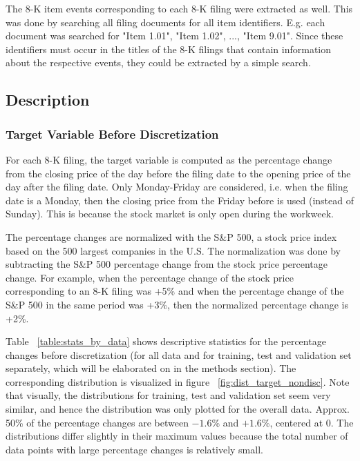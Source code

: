 \documentclass{article}
\begin{document}
	The 8-K item events corresponding to each 8-K filing were extracted as well. This was done by searching all filing documents for all item identifiers. E.g. each document was searched for "Item 1.01", "Item 1.02", ..., "Item 9.01". Since these identifiers must occur in the titles of the 8-K filings that contain information about the respective events, they could be extracted by a simple search. 
	
	\subsection{Description}
	
	
	\subsubsection{Target Variable Before Discretization}
	
	For each 8-K filing, the target variable is computed as the percentage change from the closing price of the day before the filing date to the opening price of the day after the filing date. Only Monday-Friday are considered, i.e. when the filing date is a Monday, then the closing price from the Friday before is used (instead of Sunday). This is because the stock market is only open during the workweek.
	
	The percentage changes are normalized with the S\&P 500, a stock price index based on the 500 largest companies in the U.S. The normalization was done by subtracting the S\&P 500 percentage change from the stock price percentage change. For example, when the percentage change of the stock price corresponding to an 8-K filing was +5\% and when the percentage change of the S\&P 500 in the same period was +3\%, then the normalized percentage change is +2\%.
	
	Table ~\ref{table:stats_by_data} shows descriptive statistics for the percentage changes before discretization (for all data and for training, test and validation set separately, which will be elaborated on in the methods section). The corresponding distribution is visualized in figure ~\ref{fig:dist_target_nondisc}. Note that visually, the distributions for training, test and validation set seem very similar, and hence the distribution was only plotted for the overall data. Approx. 50\% of the percentage changes are between $-1.6$\% and $+1.6$\%, centered at $0$. The distributions differ slightly in their maximum values because the total number of data points with large percentage changes is relatively small.
\end{document}
